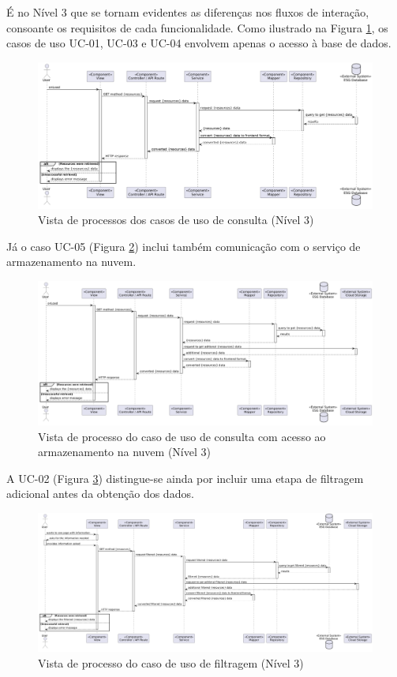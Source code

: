 É no Nível 3 que se tornam evidentes as diferenças nos fluxos de interação, consoante os requisitos de cada funcionalidade. Como ilustrado na Figura \ref{fig:UC134-lvl3}, os casos de uso UC-01, UC-03 e UC-04 envolvem apenas o acesso à base de dados.

\begin{figure}[H]
\centering
\includegraphics[width=\linewidth]{frontmatter/assets/diagrams/Process Views/LVL3/uc134-lvl3.png}
\caption{Vista de processos dos casos de uso de consulta (Nível 3)}
\label{fig:UC134-lvl3}
\end{figure}

Já o caso UC-05 (Figura \ref{fig:UC5-lvl3}) inclui também comunicação com o serviço de armazenamento na nuvem.

\begin{figure}[H]
\centering
\includegraphics[width=\linewidth]{frontmatter/assets/diagrams/Process Views/LVL3/uc-05-lvl3.png}
\caption{Vista de processo do caso de uso de consulta com acesso ao armazenamento na nuvem (Nível 3)}
\label{fig:UC5-lvl3}
\end{figure}

A UC-02 (Figura \ref{fig:UC2-lvl3}) distingue-se ainda por incluir uma etapa de filtragem adicional antes da obtenção dos dados.

\begin{figure}[H]
\centering
\includegraphics[width=\linewidth]{frontmatter/assets/diagrams/Process Views/LVL3/uc-02-lvl3.png}
\caption{Vista de processo do caso de uso de filtragem (Nível 3)}
\label{fig:UC2-lvl3}
\end{figure}

